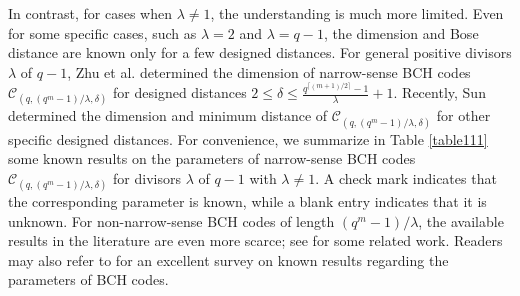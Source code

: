 \documentclass[journal,onecolumn]{IEEEtran}
\begin{document}
In contrast, for cases when
$\lambda\neq 1$, the understanding is much more limited. Even for some specific cases, such as $\lambda = 2$ and $\lambda = q-1$,
the dimension and Bose distance are known only for a few designed distances.
For general positive  divisors $\lambda$ of $q-1$, Zhu et al.  \cite{ZSK2019}   determined the
 dimension of narrow-sense BCH codes $\mathcal{C}_{(q,(q^m-1)/\lambda,\delta)}$  for designed distances $2\leq \delta\leq    \frac{q^{\lceil (m+1)/2 \rceil}-1}{\lambda} + 1$. Recently, Sun \cite{S2025} determined the dimension and minimum distance of $\mathcal{C}_{(q,(q^m-1)/\lambda,\delta)}$ for  other specific designed distances. For convenience, we summarize  in Table \ref{table111} some known results on the parameters of  narrow-sense BCH codes $\mathcal{C}_{(q,(q^m-1)/\lambda,\delta)}$ for divisors $\lambda$ of $q-1$ with $\lambda\neq 1$. A check mark \checkmark indicates that the corresponding parameter is known, while a blank entry indicates that it is unknown.  
For non-narrow-sense BCH codes of length $(q^m-1)/\lambda$,
the available results in the literature are even more scarce;
see \cite{liu2017} for some related work.
   Readers may  also refer to \cite{ding2024bch} for an excellent survey on known results regarding the parameters of BCH codes.
\end{document}
